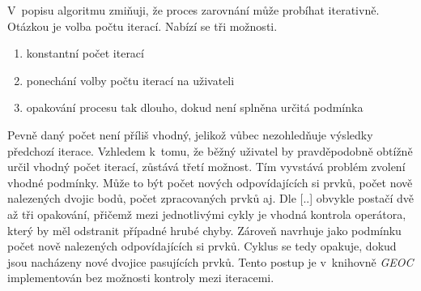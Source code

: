V~popisu algoritmu zmiňuji, že proces zarovnání může probíhat iterativně.
Otázkou je volba počtu iterací. Nabízí se tři možnosti.
\begin{enumerate}
 \item konstantní počet iterací
 \item ponechání volby počtu iterací na uživateli
 \item opakování procesu tak dlouho, dokud není splněna určitá podmínka
\end{enumerate}
Pevně daný počet není příliš vhodný, jelikož vůbec nezohledňuje výsledky
předchozí iterace. Vzhledem k~tomu, že běžný uživatel by pravděpodobně
obtížně určil vhodný počet iterací, zůstává třetí možnost. Tím vyvstává
problém zvolení vhodné podmínky. Může to být počet nových odpovídajících 
si prvků, počet nově nalezených dvojic bodů, počet zpracovaných prvků aj.
Dle [..]  obvykle postačí dvě až tři opakování, %
přičemž mezi jednotlivými cykly je vhodná kontrola operátora,
který by měl odstranit případné hrubé chyby. Zároveň navrhuje jako podmínku
počet nově nalezených odpovídajících si prvků. Cyklus se tedy opakuje,
dokud jsou nacházeny nové dvojice pasujících prvků. Tento postup je   %
v~knihovně \textit{GEOC} implementován bez možnosti kontroly mezi iteracemi. 



